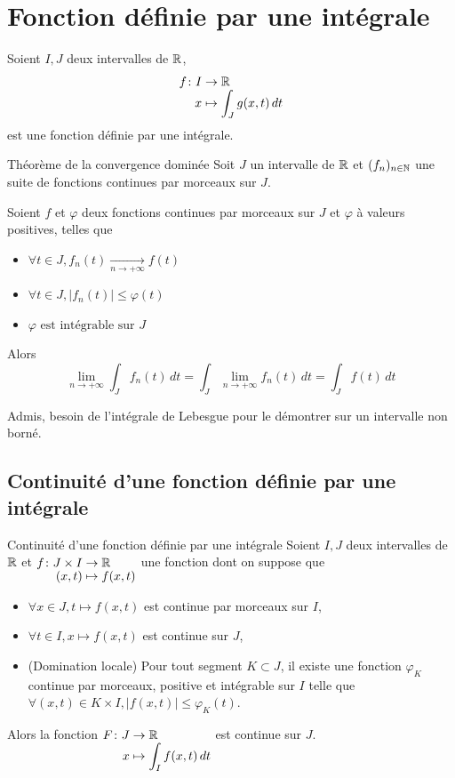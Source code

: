 \documentclass[a4paper, 12pt]{article}
\renewcommand*{\today}{20 April 2026}
\begin{document}
\hotbox{Analyse 4}{CM 15}{\today}

\section{Fonction définie par une intégrale}

\begin{definition}
    Soient $I, J$ deux intervalles de $\mathbb{R}$,
    $$
    \funcdef{f}{I}{\R}{x}{\int_J g(x, t) \, dt}
    $$
    est une fonction définie par une intégrale.
\end{definition}

\begin{theoreme}{Théorème de la convergence dominée}{}
    Soit $J$ un intervalle de $\mathbb{R}$ et $(f_n)_{n \in \mathbb{N}}$ une suite de fonctions continues par morceaux sur $J$.

    Soient $f$ et $\varphi$ deux fonctions continues par morceaux sur $J$ et $\varphi$ à valeurs positives, telles que
    \begin{itemize}
        \item $\forall t \in J, f_n(t) \xrightarrow[n \to +\infty]{} f(t)$
        \item $\forall t \in J, |f_n(t)| \leq \varphi(t)$
        \item $\varphi \text{ est intégrable sur } J$
    \end{itemize}
    Alors
    $$
    \lim_{n \to +\infty} \int_J f_n(t) \, dt = \int_J \lim_{n \to +\infty} f_n(t) \, dt = \int_J f(t) \, dt
    $$
\end{theoreme}

\begin{demonstration}
    Admis, besoin de l'intégrale de Lebesgue pour le démontrer sur un intervalle non borné.
\end{demonstration}

\subsection{Continuité d'une fonction définie par une intégrale}

\begin{theoreme}{Continuité d'une fonction définie par une intégrale}{}
    Soient $I, J$ deux intervalles de $\mathbb{R}$ et $\funcdef{f}{J \times I}{\R}{(x, t)}{f(x, t)}$ une fonction dont on suppose que
    \begin{itemize}
        \item $\forall x \in J, t \mapsto f(x, t)$ est continue par morceaux sur $I$,
        \item $\forall t \in I, x \mapsto f(x, t)$ est continue sur $J$,
        \item (Domination locale) Pour tout segment $K \subset J$, il existe une fonction $\varphi_K$ continue par morceaux, positive et intégrable sur $I$ telle que $\forall (x, t) \in K \times I, |f(x, t)| \leq \varphi_K(t)$.
    \end{itemize}
    Alors la fonction $\funcdef{F}{J}{\R}{x}{\int_I f(x, t) \, dt}$ est continue sur $J$.
\end{theoreme}
\end{document}
